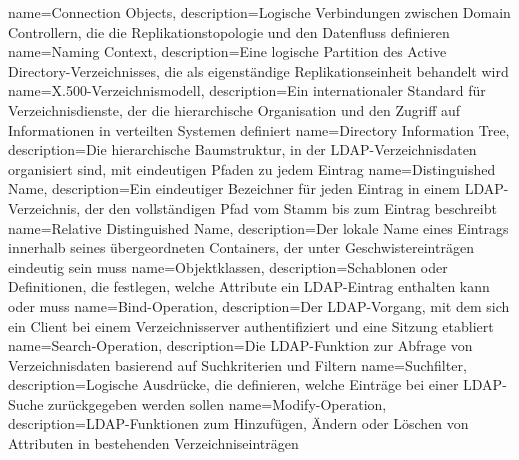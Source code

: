 {
	name={Con\-nec\-tion Ob\-jects},
	description={Lo\-gi\-sche Ver\-bin\-dun\-gen zwi\-schen Do\-main Con\-trol\-lern, die die Re\-pli\-ka\-ti\-ons\-to\-po\-lo\-gie und den Da\-ten\-fluss de\-fi\-nie\-ren}
}
{
	name={Na\-ming Con\-text},
	description={Eine lo\-gi\-sche Par\-ti\-ti\-on des Ac\-tive Di\-rec\-to\-ry-Ver\-zeich\-nis\-ses, die als ei\-gen\-stän\-di\-ge Re\-pli\-ka\-ti\-ons\-ein\-heit be\-han\-delt wird}
}
{
	name={X.500-Ver\-zeich\-nis\-mo\-dell},
	description={Ein in\-ter\-na\-tio\-na\-ler Stan\-dard für Ver\-zeich\-nis\-diens\-te, der die hier\-ar\-chi\-sche Or\-ga\-ni\-sa\-ti\-on und den Zu\-griff auf In\-for\-ma\-tio\-nen in ver\-teil\-ten Sys\-te\-men de\-fi\-niert}
}
{
	name={Di\-rec\-to\-ry In\-for\-ma\-ti\-on Tree},
	description={Die hier\-ar\-chi\-sche Baum\-struk\-tur, in der LDAP-Ver\-zeich\-nis\-da\-ten or\-ga\-ni\-siert sind, mit ein\-deu\-ti\-gen Pfa\-den zu je\-dem Ein\-trag}
}
{
	name={Dis\-tin\-guished Name},
	description={Ein ein\-deu\-ti\-ger Be\-zeich\-ner für je\-den Ein\-trag in ei\-nem LDAP-Ver\-zeich\-nis, der den voll\-stän\-di\-gen Pfad vom Stamm bis zum Ein\-trag be\-schreibt}
}
{
	name={Re\-la\-tive Dis\-tin\-guished Name},
	description={Der lo\-ka\-le Name ei\-nes Ein\-trags in\-ner\-halb sei\-nes über\-ge\-ord\-ne\-ten Con\-tai\-ners, der un\-ter Ge\-schwis\-ter\-ein\-trä\-gen ein\-deu\-tig sein muss}
}
{
	name={Ob\-jekt\-klas\-sen},
	description={Scha\-blo\-nen oder De\-fi\-ni\-tio\-nen, die fest\-le\-gen, wel\-che At\-tri\-bu\-te ein LDAP-Ein\-trag ent\-hal\-ten kann oder muss}
}
{
	name={Bind-Ope\-ra\-ti\-on},
	description={Der LDAP-Vor\-gang, mit dem sich ein Cli\-ent bei ei\-nem Ver\-zeich\-nis\-ser\-ver au\-then\-ti\-fi\-ziert und eine Sit\-zung eta\-bliert}
}
{
	name={Search-Ope\-ra\-ti\-on},
	description={Die LDAP-Funk\-ti\-on zur Ab\-fra\-ge von Ver\-zeich\-nis\-da\-ten ba\-sie\-rend auf Such\-kri\-te\-ri\-en und Fil\-tern}
}
{
	name={Such\-fil\-ter},
	description={Lo\-gi\-sche Aus\-drü\-cke, die de\-fi\-nie\-ren, wel\-che Ein\-trä\-ge bei ei\-ner LDAP-Su\-che zu\-rück\-ge\-ge\-ben wer\-den sol\-len}
}
{
	name={Mo\-di\-fy-Ope\-ra\-ti\-on},
	description={LDAP-Funk\-tio\-nen zum Hin\-zu\-fü\-gen, Än\-dern oder Lö\-schen von At\-tri\-bu\-ten in be\-ste\-hen\-den Ver\-zeich\-nis\-ein\-trä\-gen}
}
